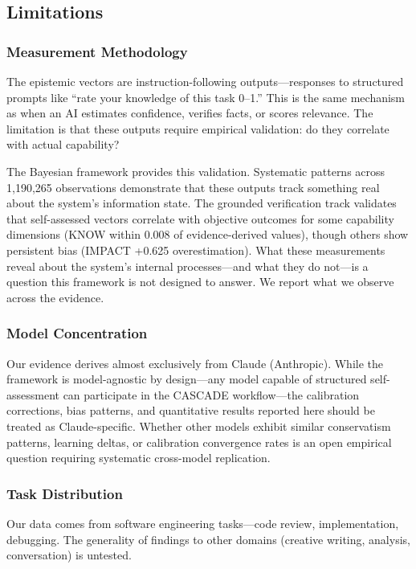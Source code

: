 \subsection{Limitations}

\subsubsection{Measurement Methodology}

The epistemic vectors are instruction-following outputs---responses to structured prompts like ``rate your knowledge of this task 0--1.'' This is the same mechanism as when an AI estimates confidence, verifies facts, or scores relevance. The limitation is that these outputs require empirical validation: do they correlate with actual capability?

The Bayesian framework provides this validation. Systematic patterns across 1,190,265 observations demonstrate that these outputs track something real about the system's information state. The grounded verification track validates that self-assessed vectors correlate with objective outcomes for some capability dimensions (KNOW within 0.008 of evidence-derived values), though others show persistent bias (IMPACT +0.625 overestimation). What these measurements reveal about the system's internal processes---and what they do not---is a question this framework is not designed to answer. We report what we observe across the evidence.

\subsubsection{Model Concentration}

Our evidence derives almost exclusively from Claude (Anthropic). While the framework is model-agnostic by design---any model capable of structured self-assessment can participate in the CASCADE workflow---the calibration corrections, bias patterns, and quantitative results reported here should be treated as Claude-specific. Whether other models exhibit similar conservatism patterns, learning deltas, or calibration convergence rates is an open empirical question requiring systematic cross-model replication.

\subsubsection{Task Distribution}

Our data comes from software engineering tasks---code review, implementation, debugging. The generality of findings to other domains (creative writing, analysis, conversation) is untested.

